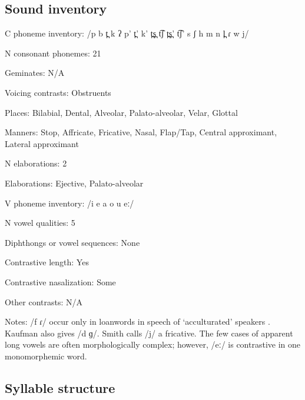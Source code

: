 {\subsection*{Sound inventory}
\begin{appendixdesc}

\item[C phoneme inventory:] /p b t̪ k ʔ p’ t̪’ k’ t̪s̪ t͡ʃ t̪s̪’ t͡ʃ’ s ʃ h m n l̪ ɾ w j/

\item[N consonant phonemes:] 21

\item[Geminates:] N/A

\item[Voicing contrasts:] Obstruents

\item[Places:] Bilabial, Dental, Alveolar, Palato-alveolar, Velar, Glottal

\item[Manners:] Stop, Affricate, Fricative, Nasal, Flap/Tap, Central approximant, Lateral approximant

\item[N elaborations:] 2

\item[Elaborations:] Ejective, Palato-alveolar

\item[V phoneme inventory:] /i e a o u eː/

\item[N vowel qualities:] 5

\item[Diphthongs or vowel sequences:] None

\item[Contrastive length:] Yes

\item[Contrastive nasalization:] Some

\item[Other contrasts:] N/A

\item[Notes:] /f ɾ/ occur only in loanwords in speech of ‘acculturated’ speakers \citep[13]{Kaufman1971}. Kaufman also gives /d ɡ/. Smith calls /j/ a fricative. The few cases of apparent long vowels are often morphologically complex; however, /eː/ is contrastive in one monomorphemic word.
\end{appendixdesc}
\subsection*{Syllable structure}
\begin{appendixdesc}


\end{appendixdesc}}
